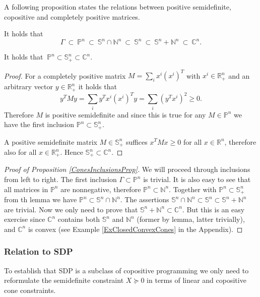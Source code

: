 \documentclass[12pt]{book}
\theoremstyle{definition}
\begin{document}
A following proposition states the relations between positive semidefinite, copositive and completely positive matrices.

\prop It holds that 
\label{ConesInclusionsProp}
$$\Gamma \ \subset \ \mathbb{P}^n \ \subset \ \mathbb{S}^n \cap \mathbb{N}^n \ \subset \ \mathbb{S}^n \ \subset \ \mathbb{S}^n + \mathbb{N}^n \ \subset \ \mathbb{C}^n. $$ \rm


\lema
\label{lemmaCPPSDPCP} It holds that  
$\ \mathbb{P}^n \subset \mathbb{S}^n_+ \subset \mathbb{C}^n. $ \rm
\begin{proof}
For a completely positive matrix $M=\sum_i x^i(x^i)^T$ with $x^i \in \mathbb{R}^n_+$ and an arbitrary vector $y\in\mathbb{R}^n_+$ it holds that 
$$ y^TMy = \sum_i y^Tx^i(x^i)^Ty = \sum_i (y^Tx^i)^2 \geq 0.$$
Therefore $M$ is positive semidefinite and since this is true for any $M\in \mathbb{P}^n$ we have the first inclusion $\mathbb{P}^n \subset \mathbb{S}^n_+$.

A positive semidefinite matrix $M\in\mathbb{S}^n_+$ suffices $x^TMx\geq 0$ for all $x\in \mathbb{R}^n$, therefore also 
for all $x\in \mathbb{R}^n_+$. Hence $ \mathbb{S}^n_+ \subset \mathbb{C}^n. $
\end{proof}
\begin{proof}[Proof of Proposition \ref{ConesInclusionsProp}]
We will proceed through inclusions from left to right. The first inclusion $\Gamma\subset \mathbb{P}^n$ is trivial. It is also easy to see that all matrices in $\mathbb{P}^n$ are nonnegative, therefore $\mathbb{P}^n \subset \mathbb{N}^n$. Together with $\mathbb{P}^n \subset \mathbb{S}_+^n$ from th lemma we have $\mathbb{P}^n \subset \mathbb{S}^n \cap \mathbb{N}^n$. The assertions $\mathbb{S}^n \cap \mathbb{N}^n \subset \mathbb{S}^n \subset \mathbb{S}^n + \mathbb{N}^n$ are trivial. Now we only need to prove that $\mathbb{S}^n + \mathbb{N}^n\subset \mathbb{C}^n. $ But this is an easy exercise since $\mathbb{C}^n$ contains both $\mathbb{S}^n$ and $\mathbb{N}^n$ (former by lemma, latter trivially), and $\mathbb{C}^n$ is convex (see Example \ref{ExClosedConvexCones} in the Appendix).
\end{proof}

\subsubsection{Relation to SDP}
To establish that SDP is a subclass of copositive programming we only need to reformulate the semidefinite constraint $X\succeq 0$ in terms of linear and copositive cone constraints.
\end{document}
